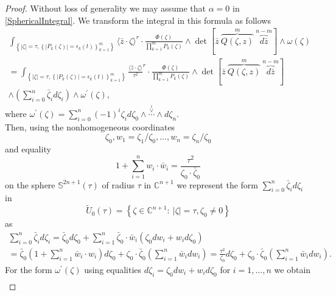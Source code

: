 \documentclass[11pt,reqno]{amsart}
\numberwithin{equation}{section}
\begin{document}
\begin{proof} Without loss of generality we may assume that $\alpha=0$ in \eqref{SphericalIntegral}.
We transform the integral in this formula as follows
\begin{multline*}
\int_{\left\{|\zeta|=\tau,\left\{|P_k(\zeta)|=\epsilon_k(t)\right\}_{k=1}^m\right\}}
\langle{\bar z}\cdot\zeta\rangle^r\cdot\frac{\Phi(\zeta)}{\prod_{k=1}^mP_k(\zeta)}
\wedge\det\left[{\bar z}\ \overbrace{Q(\zeta,z)}^{m}\
\overbrace{d{\bar z}}^{n-m}\right]\wedge\omega(\zeta)\\
=\int_{\left\{|\zeta|=\tau,\left\{|P_k(\zeta)|=\epsilon_k(t)\right\}_{k=1}^m\right\}}
\frac{\langle{\bar z}\cdot\zeta\rangle}{\tau^2}^r\cdot\frac{\Phi(\zeta)}{\prod_{k=1}^mP_k(\zeta)}
\wedge\det\left[{\bar z}\ \overbrace{Q(\zeta,z)}^{m}\ \overbrace{d{\bar z}}^{n-m}\right]\\
\wedge\left(\sum_{i=0}^n{\bar\zeta}_id\zeta_i\right)\wedge\omega^{\prime}(\zeta),
\end{multline*}
where $\omega^{\prime}(\zeta)=\sum_{i=0}^n(-1)^{i}\zeta_id\zeta_0
\wedge\stackrel{\stackrel{i}{\vee}}{\cdots}\wedge d\zeta_n$.\\
\indent
Then, using the nonhomogeneous coordinates
\begin{equation}\label{Nonhomogeneous}
\zeta_0,w_1=\zeta_1/\zeta_0,\dots,w_n=\zeta_n/\zeta_0
\end{equation}
and equality
\begin{equation}\label{r0Dependence}
1+\sum_{i=1}^nw_i\cdot{\bar w}_i=\frac{\tau^2}{\zeta_0\cdot{\bar\zeta}_0}
\end{equation}
on the sphere ${{\mathbb S}}^{2n+1}(\tau)$ of radius $\tau$ in ${{\mathbb C}}^{n+1}$ we represent the form
$\sum_{i=0}^n{\bar\zeta}_id\zeta_i$ in
$${\widetilde U}_0(\tau)=\left\{\zeta\in{{\mathbb C}}^{n+1}:\ |\zeta|=\tau, \zeta_0\neq 0\right\}$$
as
\begin{multline}\label{dModuleRepresentation}
\sum_{i=0}^n{\bar\zeta}_id\zeta_i={\bar\zeta}_0d\zeta_0
+\sum_{i=1}^n{\bar\zeta}_0\cdot{\bar w}_i\left(\zeta_0dw_i+w_id\zeta_0\right)\\
={\bar\zeta}_0\left(1+\sum_{i=1}^n{\bar w}_i\cdot w_i\right)d\zeta_0
+\zeta_0\cdot {\bar\zeta}_0\left(\sum_{i=1}^n{\bar w}_idw_i\right)
=\frac{\tau^2}{\zeta_0}d\zeta_0+\zeta_0\cdot {\bar\zeta}_0\left(\sum_{i=1}^n{\bar w}_idw_i\right).
\end{multline}
\indent
For the form $\omega^{\prime}(\zeta)$ using equalities $d\zeta_i=\zeta_0dw_i+w_id\zeta_0$
for $i=1,\dots,n$ we obtain
\begin{multline}\label{OmegaRepresentation}

\end{multline}
\end{proof}
\end{document}
